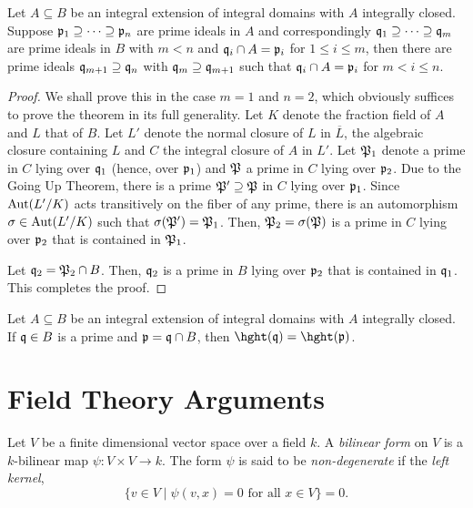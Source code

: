 \begin{theorem}
    Let $A\subseteq B$ be an integral extension of integral domains with $A$ integrally closed. Suppose $\mathfrak p_1\supseteq\dots\supseteq\mathfrak p_n$ are prime ideals in $A$ and correspondingly $\mathfrak q_1\supseteq\dots\supseteq\mathfrak q_m$ are prime ideals in $B$ with $m < n$ and $\mathfrak q_i\cap A = \mathfrak p_i$ for $1\le i\le m$, then there are prime ideals $\mathfrak q_{m + 1}\supseteq\mathfrak q_{n}$ with $\mathfrak q_m\supseteq\mathfrak q_{m + 1}$ such that $\mathfrak q_i\cap A = \mathfrak p_i$ for $m < i\le n$.
\end{theorem}
\begin{proof}
    We shall prove this in the case $m = 1$ and $n = 2$, which obviously suffices to prove the theorem in its full generality. Let $K$ denote the fraction field of $A$ and $L$ that of $B$. Let $L'$ denote the normal closure of $L$ in $\overline L$, the algebraic closure containing $L$ and $C$ the integral closure of $A$ in $L'$. Let $\mathfrak P_1$ denote a prime in $C$ lying over $\mathfrak q_1$ (hence, over $\mathfrak p_1$) and $\mathfrak P$ a prime in $C$ lying over $\mathfrak p_2$. Due to the Going Up Theorem, there is a prime $\mathfrak P'\supseteq\mathfrak P$ in $C$ lying over $\mathfrak p_1$. Since $\operatorname{Aut}(L'/K)$ acts transitively on the fiber of any prime, there is an automorphism $\sigma\in\operatorname{Aut}(L'/K)$ such that $\sigma(\mathfrak P') = \mathfrak P_1$. Then, $\mathfrak P_2 = \sigma(\mathfrak P)$ is a prime in $C$ lying over $\mathfrak p_2$ that is contained in $\mathfrak P_1$.

    Let $\mathfrak q_2 = \mathfrak P_2\cap B$. Then, $\mathfrak q_2$ is a prime in $B$ lying over $\mathfrak p_2$ that is contained in $\mathfrak q_1$. This completes the proof.
\end{proof}

\begin{corollary}
    Let $A\subseteq B$ be an integral extension of integral domains with $A$ integrally closed. If $\mathfrak q\in B$ is a prime and $\mathfrak p = \mathfrak q\cap B$, then $\hght(\frakq) = \hght(\frakp)$.
\end{corollary}

\section{Field Theory Arguments}

\begin{definition}
    Let $V$ be a finite dimensional vector space over a field $k$. A \emph{bilinear form} on $V$ is a $k$-bilinear map $\psi: V\times V\to k$. The form $\psi$ is said to be \emph{non-degenerate} if the \emph{left kernel},
    \begin{equation*}
        \{v\in V\mid\psi(v, x) = 0\text{ for all }x\in V\} = 0.
    \end{equation*}
\end{definition}

